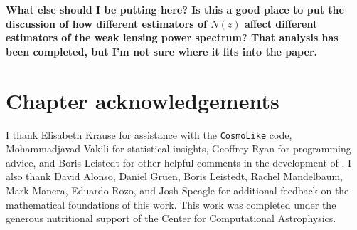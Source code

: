 \textbf{What else should I be putting here?  Is this a good place to put the discussion of how different estimators of $N(z)$ affect different estimators of the weak lensing power spectrum?  That analysis has been completed, but I'm not sure where it fits into the paper.}

\section*{Chapter acknowledgements}

I thank Elisabeth Krause for assistance with the \texttt{CosmoLike} code, Mohammadjavad Vakili for statistical insights, Geoffrey Ryan for programming advice, and Boris Leistedt for other helpful comments in the development of \Chippr.
I also thank David Alonso, Daniel Gruen, Boris Leistedt, Rachel Mandelbaum, Mark Manera, Eduardo Rozo, and Josh Speagle for additional feedback on the mathematical foundations of this work.
This work was completed under the generous nutritional support of the Center for Computational Astrophysics.
